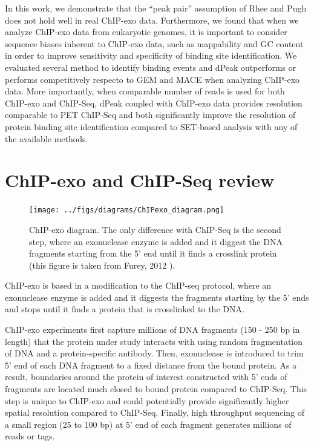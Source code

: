 \documentclass[11pt]{article}\usepackage[]{graphicx}\usepackage[]{color}
\begin{document}
In this work, we demonstrate that the ``peak pair'' assumption of
Rhee and Pugh \cite{exo1} does not hold well in real ChIP-exo
data. Furthermore, we found that when we analyze ChIP-exo data from
eukaryotic genomes, it is important to consider sequence biases
inherent to ChIP-exo data, such as mappability and GC content in order
to improve sensitivity and specificity of binding site
identification. We evaluated several method to identify binding events
and dPeak outperforms or performs competitively respecto to GEM and
MACE when analyzing ChIP-exo data. More importantly, when comparable
number of reads is used for both ChIP-exo and ChIP-Seq, dPeak coupled
with ChIP-exo data provides resolution comparable to PET ChIP-Seq and
both significantly improve the resolution of protein binding site
identification compared to SET-based analysis with any of the
available methods.

\section{ChIP-exo and ChIP-Seq review}
\label{sec:exo}

\begin{figure}
\centering
\texttt{[image: ../figs/diagrams/ChIPexo\_diagram.png]}
\caption{ChIP-exo diagram. The only difference with ChIP-Seq is the
  second step, where an exonuclease enzyme is added and it diggest the
  DNA fragments starting from the 5' end until it finds a crosslink
  protein (this figure is taken from Furey, 2012 \cite{chipbeyond}).}
\label{fig:exo}
\end{figure}

ChIP-exo is based in a modification to the ChIP-seq protocol, where an
exonuclease enzyme is added and it diggests the fragments starting by
the 5' ends and stops until it finds a protein that is crosslinked to
the DNA.

ChIP-exo experiments first capture millions of DNA fragments
(150 - 250 bp in length) that the protein under study interacts with
using random fragmentation of DNA and a protein-specific
antibody. Then, exonuclease is introduced to trim 5' end of each DNA
fragment to a fixed distance from the bound protein. As a result,
boundaries around the protein of interest constructed with 5' ends of
fragments are located much closed to bound protein compared to
ChIP-Seq. This step is unique to ChIP-exo and could potentially
provide significantly higher spatial resolution compared to
ChIP-Seq. Finally, high throughput sequencing of a small region (25 to
100 bp) at 5' end of each fragment generates millions of reads or
tags.
\end{document}
